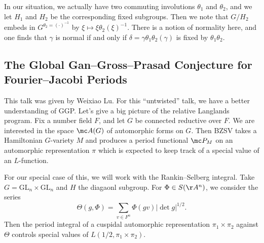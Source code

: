 \documentclass{article}
\begin{document}
In our situation, we actually have two commuting involutions $\theta_1$ and $\theta_2$, and we let $H_1$ and $H_2$ be the corresponding fixed subgroups. Then we note that $G/H_2$ embeds in $G^{\theta_2=(\cdot)^{-1}}$ by $\xi\mapsto\xi\theta_2(\xi)^{-1}$. There is a notion of normality here, and one finds that $\gamma$ is normal if and only if $\delta=\gamma\theta_1\theta_2(\gamma)$ is fixed by $\theta_1\theta_2$.

\subsection{The Global Gan--Gross--Prasad Conjecture for Fourier--Jacobi Periods}
This talk was given by Weixiao Lu. For this ``untwisted'' talk, we have a better understanding of GGP. Let's give a big picture of the relative Langlands program. Fix a number field $F$, and let $G$ be connected reductive over $F$. We are interested in the space $\mc A(G)$ of automorphic forms on $G$. Then BZSV takes a Hamiltonian $G$-variety $M$ and produces a period functional $\mc P_M$ on an automorphic representation $\pi$ which is expected to keep track of a special value of an $L$-function.

For our special case of this, we will work with the Rankin--Selberg integral. Take $G=\mathrm{GL}_n\times\mathrm{GL}_n$ and $H$ the diagaonl subgroup. For $\Phi\in S(\AA^n)$, we consider the series
\[\Theta(g,\Phi)=\sum_{v\in F^n}\Phi(gv)\left|\det g\right|^{1/2}.\]
Then the period integral of a cuspidal automorphic representation $\pi_1\times\pi_2$ against $\Theta$ controls special values of $L(1/2,\pi_1\times\pi_2)$.
\end{document}
